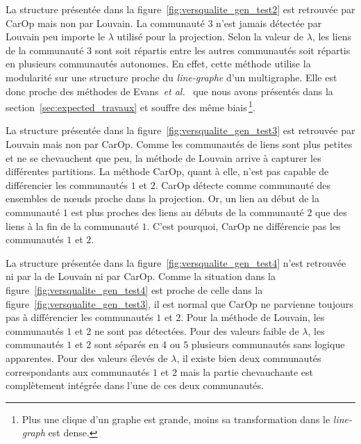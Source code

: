 La structure présentée dans la figure~\ref{fig:versqualite_gen_test2} est retrouvée par CarOp mais non par Louvain.
La communauté $3$ n'est jamais détectée par Louvain peu importe le $\lambda$ utilisé pour la projection.
Selon la valeur de $\lambda$, les liens de la communauté $3$ sont soit répartis entre les autres communautés soit répartis en plusieurs communautés autonomes.
En effet, cette méthode utilise la modularité sur une structure proche du \emph{line-graphe} d'un multigraphe.
Elle est donc proche des méthodes de Evans~\emph{et al.}~\cite{Evans2009} que nous avons présentés dans la section~\ref{sec:expected_travaux} et souffre des même biais\,\footnote{Plus une clique d'un graphe est grande, moins sa transformation dans le \emph{line-graph} est dense.}.

La structure présentée dans la figure~\ref{fig:versqualite_gen_test3} est retrouvée par Louvain mais non par CarOp.
Comme les communautés de liens sont plus petites et ne se chevauchent que peu, la méthode de Louvain arrive à capturer les différentes partitions.
La méthode CarOp, quant à elle, n'est pas capable de différencier les communautés $1$ et $2$.
CarOp détecte comme communauté des ensembles de n\oe uds proche dans la projection.
Or, un lien au début de la communauté $1$ est plus proches des liens au débuts de la communauté $2$ que des liens à la fin de la communauté $1$.
C'est pourquoi, CarOp ne différencie pas les communautés $1$ et $2$.

La structure présentée dans la figure~\ref{fig:versqualite_gen_test4} n'est retrouvée ni par la de Louvain ni par CarOp.
Comme la situation dans la figure~\ref{fig:versqualite_gen_test4} est proche de celle dans la figure~\ref{fig:versqualite_gen_test3}, il est normal que CarOp ne parvienne toujours pas à différencier les communautés $1$ et $2$.
Pour la méthode de Louvain, les communautés $1$ et $2$ ne sont pas détectées.
Pour des valeurs faible de $\lambda$, les communautés $1$ et $2$ sont séparés en  $4$ ou $5$ plusieurs communautés sans logique apparentes.
Pour des valeurs élevés de $\lambda$, il existe bien deux communautés correspondants aux communautés $1$ et $2$ mais la partie chevauchante est complètement intégrée dans l'une de ces deux communautés.




